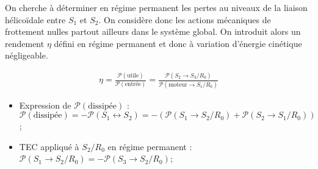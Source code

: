 \begin{multicols}{2}
On cherche à déterminer en régime permanent les pertes au niveaux de la liaison hélicoïdale entre $S_1$ et $S_2$. On considère donc les actions mécaniques de frottement nulles partout ailleurs dans le système global. On introduit alors un rendement $\eta$ défini en régime permanent et donc à variation d'énergie cinétique négligeable.


\ifprof\begin{corrige}
\begin{align*}
\eta=\frac{\mathcal{P}(\text{utile})}{\mathcal{P}(\text{entrée})}=\frac{\mathcal{P}(S_2\to S_3/R_0)}{\mathcal{P}(\text{moteur}\to S_1/R_0)}
\end{align*}
\end{corrige}\else\fi


\ifprof\begin{corrige}
\begin{itemize}
\item Expression de $\mathcal{P}(\text{dissipée})$ :
$\mathcal{P}(\text{dissipée})=-\mathcal{P}(S_1\leftrightarrow S_2)=-\left(\mathcal{P}(S_1\to S_2/R_0)+\mathcal{P}(S_2\to S_1/R_0)\right)$;
\item TEC appliqué à $S_2/R_0$ en régime permanent : 
$\mathcal{P}(S_1\to S_2/R_0)=-\mathcal{P}(S_3\to S_2/R_0)$;


\end{itemize}
\end{corrige}
\end{multicols}
